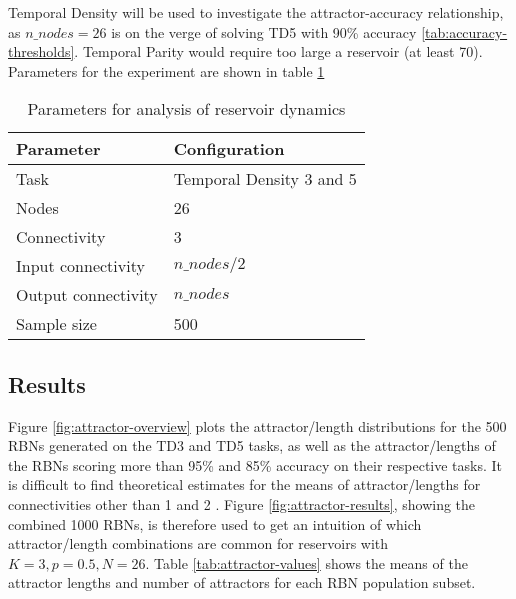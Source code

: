 Temporal Density will be used to investigate the attractor-accuracy relationship,
as $ n\_nodes = 26 $ is on the verge of solving TD5 with 90\% accuracy \ref{tab:accuracy-thresholds}.
Temporal Parity would require too large a reservoir (at least 70).
Parameters for the experiment are shown in table \ref{tab:reservoir-dynamics-parameters}

\begin{table}[ht]
    \centering
    \caption{Parameters for analysis of reservoir dynamics}
    \label{tab:reservoir-dynamics-parameters}
    \begin{tabular}{ll}
        \hline
        \textbf{Parameter} & \textbf{Configuration} \\
        \hline
        \hline
        Task                & Temporal Density 3 and 5  \\
        Nodes               & 26                        \\
        Connectivity        & 3                         \\
        Input connectivity  & $ n\_nodes / 2 $          \\
        Output connectivity & $ n\_nodes $              \\
        Sample size         & 500 \\
        \hline
    \end{tabular}
\end{table}

\subsection{Results}

Figure \ref{fig:attractor-overview} plots the attractor/length distributions for the 500 RBNs generated on the TD3 and TD5 tasks,
as well as the attractor/lengths of the RBNs scoring more than 95\% and 85\% accuracy on their respective tasks.
It is difficult to find theoretical estimates for the means of attractor/lengths for connectivities other than 1 \cite{drossel2005number} and 2 \cite{samuelsson2003superpolynomial}.
Figure \ref{fig:attractor-results}, showing the combined 1000 RBNs, is therefore used to get an intuition of which attractor/length combinations are common for reservoirs with $ K=3, p=0.5, N=26 $.
Table \ref{tab:attractor-values} shows the means of the attractor lengths and number of attractors for each RBN population subset.

